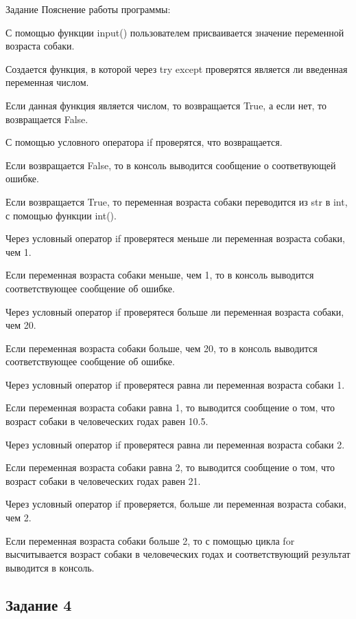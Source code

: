 \documentclass[]{vvsu}
\begin{document}
\begin{addition}{Задание}
Пояснение работы программы:
\begin{vvsu_list}
  \item С помощью функции input() пользователем присваивается значение переменной возраста собаки.
  \item Создается функция, в которой через try except проверятся является ли введенная переменная числом.
  \item Если данная функция является числом, то возвращается True, а если нет, то возвращается False.
  \item С помощью условного оператора if проверятся, что возвращается.
  \item Если возвращается False, то в консоль выводится сообщение о соответвующей ошибке.
  \item Если возвращается True, то переменная возраста собаки переводится из str в int, с помощью функции int().
  \item Через условный оператор if проверятеся меньше ли переменная возраста собаки, чем 1.
  \item Если переменная возраста собаки меньше, чем 1, то в консоль выводится соответствующее сообщение об ошибке.
  \item Через условный оператор if проверятеся больше ли переменная возраста собаки, чем 20.
  \item Если переменная возраста собаки больше, чем 20, то в консоль выводится соответствующее сообщение об ошибке.
  \item Через условный оператор if проверятеся равна ли переменная возраста собаки 1.
  \item Если переменная возраста собаки равна 1, то выводится сообщение о том, что возраст собаки в человеческих годах равен 10.5.
  \item Через условный оператор if проверятеся равна ли переменная возраста собаки 2.
  \item Если переменная возраста собаки равна 2, то выводится сообщение о том, что возраст собаки в человеческих годах равен 21.
  \item Через условный оператор if проверяется, больше ли переменная возраста собаки, чем 2.
  \item Если переменная возраста собаки больше 2, то с помощью цикла for высчитывается возраст собаки в человеческих годах и соответствующий результат выводится в консоль.
\end{vvsu_list}

\subsection{Задание 4}


\end{addition}
\end{document}
